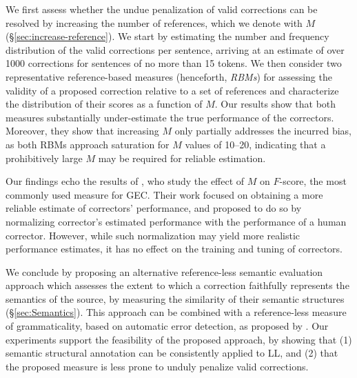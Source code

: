 \documentclass[letterpaper, 11pt]{article}
\begin{document}
We first assess whether the undue penalization of valid corrections can be resolved by increasing the number
of references, which we denote with $M$ (\S \ref{sec:increase-reference}).
We start by estimating the number and frequency distribution of the valid corrections per sentence,
arriving at an estimate of over 1000 corrections for sentences of no more than 15 tokens.
We then consider two representative reference-based measures (henceforth, {\it RBMs}) for
assessing the validity of a proposed correction relative to a set of references
and characterize the distribution of their scores as a function of $M$. 
Our results show that both measures substantially under-estimate the true performance of
the correctors. Moreover, they show that increasing $M$ only partially addresses
the incurred bias, as both RBMs approach saturation for $M$ values of 10--20,
indicating that a prohibitively large $M$ may be required for reliable estimation.

Our findings echo the results of , who study the effect of $M$
on $F$-score, the most commonly used measure for GEC. Their work focused on
obtaining a more reliable estimate of correctors' performance, and proposed to do so
by normalizing corrector's estimated performance with the performance of a human corrector. However, while such normalization may yield more realistic performance estimates,
it has no effect on the training and tuning of correctors. 

We conclude by proposing an alternative reference-less semantic evaluation approach which assesses the extent to which
a correction faithfully represents the semantics of the source, by measuring the similarity of their semantic structures (\S \ref{sec:Semantics}).
This approach can be combined with a reference-less measure of grammaticality, based on automatic error detection, as
proposed by .
Our experiments support the feasibility of the proposed approach,
by showing that (1) semantic structural annotation can be consistently applied to LL, and (2) that the proposed measure is less prone to unduly penalize valid corrections.
%
%
%
%
\end{document}
